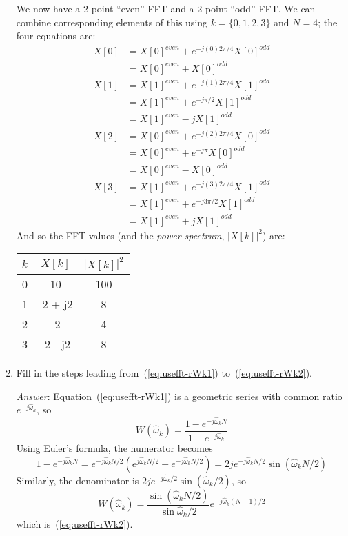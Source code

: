 \begin{enumerate}
  We now have a 2-point ``even'' FFT and a 2-point ``odd'' FFT.
  We can combine corresponding elements of this using $k=\{0, 1, 2,
  3\}$ and $N=4$; the four equations are:
  \begin{align*}
    X[0] &= X[0]^{\mathit{even}} + e^{-j(0)2\pi/4}X[0]^{\mathit{odd}} \\
    &= X[0]^{\mathit{even}} + X[0]^{\mathit{odd}} \\
    X[1] &= X[1]^{\mathit{even}} + e^{-j(1)2\pi/4}X[1]^{\mathit{odd}} \\
    &= X[1]^{\mathit{even}} + e^{-j\pi/2}X[1]^{\mathit{odd}} \\
    &= X[1]^{\mathit{even}} - j X[1]^{\mathit{odd}} \\
    X[2] &= X[0]^{\mathit{even}} + e^{-j(2)2\pi/4}X[0]^{\mathit{odd}} \\
    &= X[0]^{\mathit{even}} + e^{-j\pi}X[0]^{\mathit{odd}} \\
    &= X[0]^{\mathit{even}} - X[0]^{\mathit{odd}} \\
    X[3] &= X[1]^{\mathit{even}} + e^{-j(3)2\pi/4}X[1]^{\mathit{odd}} \\
    &= X[1]^{\mathit{even}} + e^{-j3\pi/2}X[1]^{\mathit{odd}} \\
    &= X[1]^{\mathit{even}} + j X[1]^{\mathit{odd}}
  \end{align*}
  And so the FFT values (and the \emph{power spectrum}, $|X[k]|^2$) are:
  \begin{center}
    \begin{tabular}{|c|c|c|} \hline
      $k$ & $X[k]$ & $|X[k]|^2$ \\ \hline
      0   & 10      & 100 \\
      1   & -2 + j2 & 8 \\
      2   & -2      & 4 \\
      3   & -2 - j2 & 8 \\ \hline
    \end{tabular}
  \end{center}


\item Fill in the steps leading from~(\ref{eq:usefft-rWk1})
  to~(\ref{eq:usefft-rWk2}).\label{it:ch7ex1}

  \textit{Answer}:
  Equation~(\ref{eq:usefft-rWk1}) is a geometric series with common
  ratio $e^{-j\hat{\omega}_k}$, so
  \begin{displaymath}
    W(\hat{\omega}_k)=\frac{1-e^{-j\hat{\omega}_kN}}{1-e^{-j\hat{\omega}_k}}
  \end{displaymath}
  Using Euler's formula, the numerator becomes
  \begin{equation*}
    1-e^{-j\hat{\omega}_kN} =
    e^{-j\hat{\omega}_kN/2}(e^{j\hat{\omega}_kN/2}-e^{-j\hat{\omega}_kN/2})
    =2j e^{-j\hat{\omega}_kN/2}\sin(\hat{\omega}_kN/2)
  \end{equation*}
  Similarly, the denominator is $2j
  e^{-j\hat{\omega}_k/2}\sin(\hat{\omega}_k/2)$, so
  \begin{displaymath}
    W(\hat{\omega}_k)=\frac{\sin(\hat{\omega}_kN/2)}{\sin\hat{\omega}_k/2}
    e^{-j\hat{\omega}_k(N-1)/2}
  \end{displaymath}
  which is~(\ref{eq:usefft-rWk2}).


\end{enumerate}
